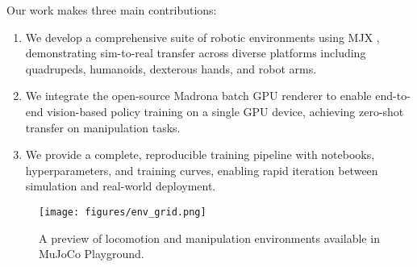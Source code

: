 \noindent Our work makes three main contributions:
\begin{enumerate}
    \item We develop a comprehensive suite of robotic environments using MJX \cite{mujocoxla}, demonstrating sim-to-real transfer across diverse platforms including quadrupeds, humanoids, dexterous hands, and robot arms.
    \item We integrate the open-source Madrona batch GPU renderer \cite{shacklett2023extensible} to enable end-to-end vision-based policy training on a single GPU device, achieving zero-shot transfer on manipulation tasks.
    \item We provide a complete, reproducible training pipeline with notebooks, hyperparameters, and training curves, enabling rapid iteration between simulation and real-world deployment.
\end{enumerate}

\begin{figure*}[t!]
    \centering
    \texttt{[image: figures/env\_grid.png]}
    \caption{\small A preview of locomotion and manipulation environments available in MuJoCo Playground.}
    \label{fig:env_grid}
\end{figure*}
